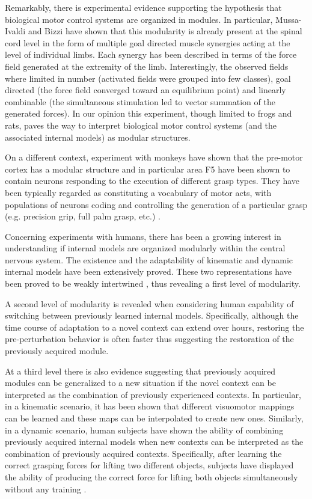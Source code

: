 \documentclass{svmult}
\begin{document}
Remarkably, there is experimental evidence supporting the hypothesis
that biological motor control systems are organized in modules. In
particular, Mussa-Ivaldi and Bizzi \cite{BizziMussa-Ivaldi} have shown
that this modularity is already present at the spinal cord level 
in the form of multiple goal directed muscle synergies acting at 
the level of individual limbs. Each synergy has been described 
in terms of the force field generated at the extremity of the limb.
Interestingly, the observed fields where limited in number (activated 
fields were grouped into few classes), goal
directed (the force field converged toward an
equilibrium point) and  linearly combinable (the simultaneous 
stimulation led to vector summation of the generated forces). In our
opinion this experiment, though limited to frogs and rats, paves the 
way to interpret biological motor control systems (and the 
associated internal models) as modular structures. 

On a different context, experiment with monkeys have shown that the 
pre-motor cortex has a modular structure and in particular area F5 
have been shown to contain neurons responding to the execution of different
grasp types. They have been typically regarded as constituting a vocabulary
of motor acts, with populations of neurons coding and controlling the
generation of a particular grasp (e.g. precision grip, full palm grasp,
etc.) \cite{fadiga00visuomotor}.

Concerning experiments with humans, there has been a growing interest
in understanding if internal models are organized modularly within the central
nervous system. The existence and the adaptability 
of kinematic \cite{flangan95trajectory} and dynamic internal models 
\cite{Shadmehr} have been extensively proved. These two 
representations have been proved to be weakly intertwined \cite{krakauer99independent},
thus revealing a first level of modularity. 

A second level of modularity 
is revealed when considering human capability of switching 
between previously learned internal models. Specifically, 
although the time course of adaptation to a novel context can 
extend over hours, restoring the pre-perturbation behavior is 
often faster \cite{welch93alternating,brashers-krug96consolidation}
thus suggesting the restoration of the previously acquired module. 

At a third level there is also evidence suggesting that 
previously acquired modules can be generalized
to a new situation if the novel context can be interpreted as the combination
of previously experienced contexts. In particular, in a 
kinematic scenario, it has been shown that different 
visuomotor mappings can be learned 
\cite{ghahramani97modular} and these maps can be interpolated
to create new ones. Similarly, in a dynamic scenario, 
human subjects have shown the ability of combining previously 
acquired internal models when new contexts can be
interpreted as the combination of previously acquired contexts.
Specifically, after learning the correct grasping forces 
for lifting two different objects, subjects have displayed
the ability of producing the correct force for lifting both
objects simultaneously without any training \cite{davidson04internal}.
\end{document}
